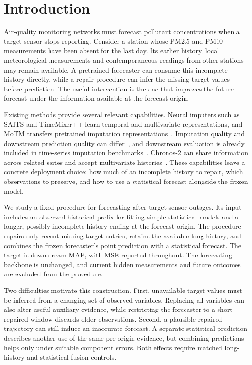 \section{Introduction}
\label{sec:introduction}

Air-quality monitoring networks must forecast pollutant concentrations when a target sensor stops reporting. Consider a station whose PM2.5 and PM10 measurements have been absent for the last day. Its earlier history, local meteorological measurements and contemporaneous readings from other stations may remain available. A pretrained forecaster can consume this incomplete history directly, while a repair procedure can infer the missing target values before prediction. The useful intervention is the one that improves the future forecast under the information available at the forecast origin.

Existing methods provide several relevant capabilities. Neural imputers such as SAITS and TimeMixer++ learn temporal and multivariate representations, and MoTM transfers pretrained imputation representations~\citep{du2023saits,wang2025timemixerpp,motmsoftware}. Imputation quality and downstream prediction quality can differ~\citep{lemorvan2021good}, and downstream evaluation is already included in time-series imputation benchmarks~\citep{du2024tsibench}. Chronos-2 can share information across related series and accept multivariate histories~\citep{ansari2025chronos2}. These capabilities leave a concrete deployment choice: how much of an incomplete history to repair, which observations to preserve, and how to use a statistical forecast alongside the frozen model.

We study a fixed procedure for forecasting after target-sensor outages. Its input includes an observed historical prefix for fitting simple statistical models and a longer, possibly incomplete history ending at the forecast origin. The procedure repairs only recent missing target entries, retains the available long history, and combines the frozen forecaster's point prediction with a statistical forecast. The target is downstream MAE, with MSE reported throughout. The forecasting backbone is unchanged, and current hidden measurements and future outcomes are excluded from the procedure.

Two difficulties motivate this construction. First, unavailable target values must be inferred from a changing set of observed variables. Replacing all variables can also alter useful auxiliary evidence, while restricting the forecaster to a short repaired window discards older observations. Second, a plausible repaired trajectory can still induce an inaccurate forecast. A separate statistical prediction describes another use of the same pre-origin evidence, but combining predictions helps only under suitable component errors. Both effects require matched long-history and statistical-fusion controls.

